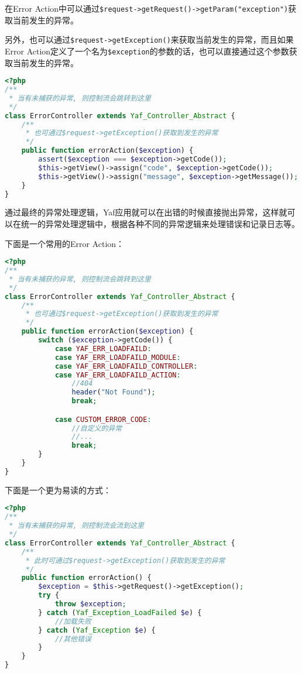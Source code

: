 在Error Action中可以通过\texttt{\$request->getRequest()->getParam("exception")}获取当前发生的异常。

另外，也可以通过\texttt{\$request->getException()}来获取当前发生的异常，而且如果Error Action定义了一个名为\texttt{\$exception}的参数的话，也可以直接通过这个参数获取当前发生的异常。




\begin{lstlisting}[language=PHP]
<?php
/**
 * 当有未捕获的异常, 则控制流会跳转到这里
 */
class ErrorController extends Yaf_Controller_Abstract {
    /**
     * 也可通过$request->getException()获取到发生的异常
     */
    public function errorAction($exception) {
        assert($exception === $exception->getCode());
        $this->getView()->assign("code", $exception->getCode());
        $this->getView()->assign("message", $exception->getMessage());
    }
}
\end{lstlisting}

通过最终的异常处理逻辑，Yaf应用就可以在出错的时候直接抛出异常，这样就可以在统一的异常处理逻辑中，根据各种不同的异常逻辑来处理错误和记录日志等。

下面是一个常用的Error Action：


\begin{lstlisting}[language=PHP]
<?php
/**
 * 当有未捕获的异常, 则控制流会跳转到这里
 */
class ErrorController extends Yaf_Controller_Abstract {
    /**
     * 也可通过$request->getException()获取到发生的异常
     */
    public function errorAction($exception) {
        switch ($exception->getCode()) {
            case YAF_ERR_LOADFAILD:
            case YAF_ERR_LOADFAILD_MODULE:
            case YAF_ERR_LOADFAILD_CONTROLLER:
            case YAF_ERR_LOADFAILD_ACTION:
                //404
                header("Not Found");
                break;

            case CUSTOM_ERROR_CODE:
                //自定义的异常
                //...
                break;
        }
    }
}
\end{lstlisting}

下面是一个更为易读的方式：



\begin{lstlisting}[language=PHP]
<?php
/**
 * 当有未捕获的异常, 则控制流会流到这里
 */
class ErrorController extends Yaf_Controller_Abstract {
    /**
     * 此时可通过$request->getException()获取到发生的异常
     */
    public function errorAction() {
        $exception = $this->getRequest()->getException();
        try {
            throw $exception;
        } catch (Yaf_Exception_LoadFailed $e) {
            //加载失败
        } catch (Yaf_Exception $e) {
            //其他错误
        }
    }
}
\end{lstlisting}


